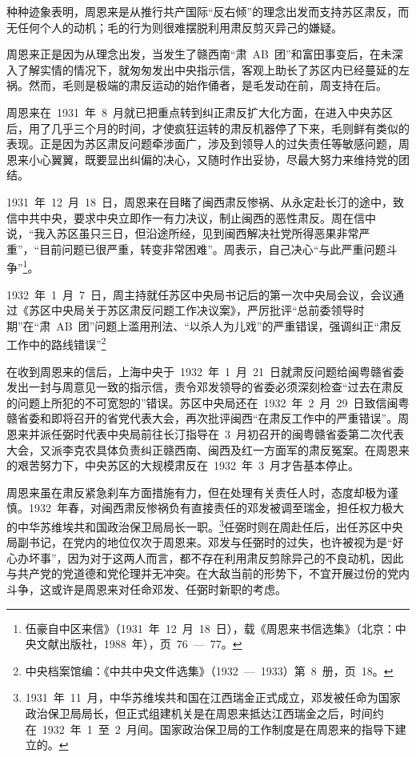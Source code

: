 种种迹象表明，周恩来是从推行共产国际“反右倾”的理念出发而支持苏区肃反，而无任何个人的动机；毛的行为则很难摆脱利用肃反剪灭异己的嫌疑。

周恩来正是因为从理念出发，当发生了赣西南“肃~AB~团”和富田事变后，在未深入了解实情的情况下，就匆匆发出中央指示信，客观上助长了苏区内已经蔓延的左祸。然而，毛则是极端的肃反运动的始作俑者，是毛发动在前，周支持在后。

周恩来在~1931~年~8~月就已把重点转到纠正肃反扩大化方面，在进入中央苏区后，用了几乎三个月的时间，才使疯狂运转的肃反机器停了下来，毛则鲜有类似的表现。正是因为苏区肃反问题牵涉面广，涉及到领导人的过失责任等敏感问题，周恩来小心翼翼，既要显出纠偏的决心，又随时作出妥协，尽最大努力来维持党的团结。

1931~年~12~月~18~日，周恩来在目睹了闽西肃反惨祸、从永定赴长汀的途中，致信中共中央，要求中央立即作一有力决议，制止闽西的恶性肃反。周在信中说，“我入苏区虽只三日，但沿途所经，见到闽西解决社党所得恶果非常严重”，“目前问题已很严重，转变非常困难”。周表示，自己决心“与此严重问题斗争”\footnote{伍豪自中区来信》（1931~年~12~月~18~日），载《周恩来书信选集》（北京：中央文献出版社，1988~年），页~76~—~77。}。

1932~年~1~月~7~日，周主持就任苏区中央局书记后的第一次中央局会议，会议通过《苏区中央局关于苏区肃反问题工作决议案》，严厉批评“总前委领导时期”在“肃~AB~团”问题上滥用刑法、“以杀人为儿戏”的严重错误，强调纠正“肃反工作中的路线错误”\footnote{中央档案馆编：《中共中央文件选集》（1932~—~1933）第~8~册，页~18。}

在收到周恩来的信后，上海中央于~1932~年~1~月~21~日就肃反问题给闽粤赣省委发出一封与周意见一致的指示信，责令邓发领导的省委必须深刻检查“过去在肃反的问题上所犯的不可宽恕的”错误。苏区中央局还在~1932~年~2~月~29~日致信闽粤赣省委和即将召开的省党代表大会，再次批评闽西“在肃反工作中的严重错误”。周恩来并派任弼时代表中央局前往长汀指导在~3~月初召开的闽粤赣省委第二次代表大会，又派李克农具体负责纠正赣西南、闽西及红一方面军的肃反冤案。在周恩来的艰苦努力下，中央苏区的大规模肃反在~1932~年~3~月才告基本停止。

周恩来虽在肃反紧急刹车方面措施有力，但在处理有关责任人时，态度却极为谨慎。1932~年春，对闽西肃反惨祸负有直接责任的邓发被调至瑞金，担任权力极大的中华苏维埃共和国政治保卫局局长一职。\footnote{1931~年~11~月，中华苏维埃共和国在江西瑞金正式成立，邓发被任命为国家政治保卫局局长，但正式组建机关是在周恩来抵达江西瑞金之后，时间约在~1932~年~1~至~2~月间。国家政治保卫局的工作制度是在周恩来的指导下建立的。}任弼时则在周赴任后，出任苏区中央局副书记，在党内的地位仅次于周恩来。邓发与任弼时的过失，也许被视为是“好心办坏事”，因为对于这两人而言，都不存在利用肃反剪除异己的不良动机，因此与共产党的党道德和党伦理并无冲突。在大敌当前的形势下，不宜开展过份的党内斗争，这或许是周恩来对任命邓发、任弼时新职的考虑。

